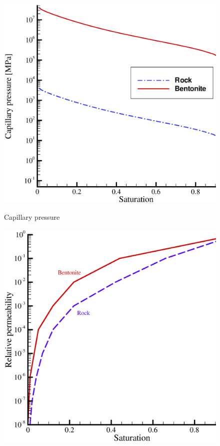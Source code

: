 \begin{figure}[!htb]
  \begin{center}
    \begin{minipage}[t]{0.45\textwidth}
      \begin{center}
        \includegraphics[scale=0.27]{HM/HM_unsat//capsat_new.eps}\\
        \centerline{Capillary pressure}
      \end{center}
    \end{minipage}
    \begin{minipage}[t]{0.45\textwidth}
      \begin{center}
        \includegraphics[scale=0.27]{HM/HM_unsat/persat.eps}\\

\end{center}
\end{minipage}
\end{center}
\end{figure}
